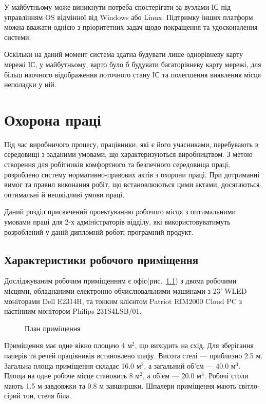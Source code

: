 \documentclass{thesis_utf8}
\begin{document}
У майбутньому може виникнути потреба спостерігати за вузлами ІС під управлінням OS відмінної від Windows або Linux. Підтримку інших платформ можна вважати однією з пріоритетних задач щодо покращення та удосконалення системи.

Оскільки на даний момент система здатна будувати лише однорівневу карту мережі ІС, у майбутньому, варто було б будувати багаторівневу карту мережі, для більш наочного відображення поточного стану ІС та полегшення виявлення місця неполадки у ній.

\chapter{Охорона праці}

Під час виробничого процесу, працівники, які є його учасниками, перебувають в середовищі з заданими умовами, що характеризуються виробництвом.
З метою створення для робітників комфортного та безпечного середовища праці, розроблено систему нормативно-правових актів з охорони праці. При дотриманні вимог та правил виконання робіт, що встановлюються цими актами, досягаються оптимальні й нешкідливі умови праці.

Даний розділ присвячений проектуванню робочого місця з оптимальними умовами праці для 2-х адміністраторів відділу, які  використовуватимуть розроблений у даній дипломній роботі програмний продукт.

\section{Характеристики робочого приміщення}
Досліджуваним робочим приміщенням є офіс(рис.~\ref{fig:office}) з двома робочими місцями, обладнаними електронно-обчислювальними машинами з 23' WLED моніторами Dell E2314H, та тонким клієнтом Patriot RIM2000 Cloud PC з настінним монітором Philips 231S4LSB/01.

\begin{figure}[!h]
    \centering
    \caption{План приміщення}
    \label{fig:office}
\end{figure}

Приміщення має одне вікно площею 4 м$^2$, що виходить на схід.
Для зберігання паперів та речей працівників встановлено шафу.
Висота стелі --- приблизно 2.5 м.
Загальна площа приміщення складає 16.0 м$^2$, а загальний об'єм --- 40.0 м$^3$.
Площа на одне робоче місце становить 8 м$^2$, а об'єм --- 20.0 м$^3$.
Робочі столи мають 1.5 м завдовжки та 0.8 м завширшки.
Шпалери приміщення мають світло-сірий тон, стеля біла.
\end{document}
